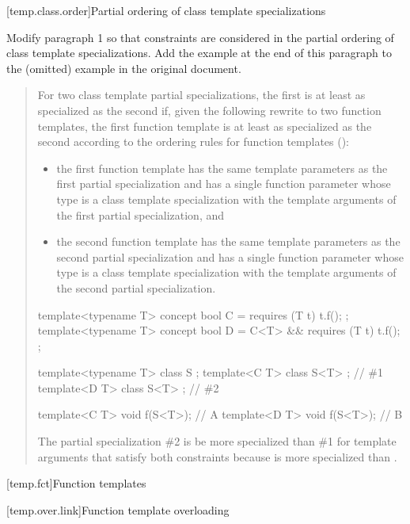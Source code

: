 [temp.class.order]{Partial ordering of class template specializations}

Modify paragraph 1 so that constraints are considered in the
partial ordering of class template specializations. Add the
example at the end of this paragraph to the (omitted) example
in the original document.

\begin{quote}
\pnum
For two class template partial specializations, the first is 
at least as specialized as the second if, given the following 
rewrite to two function templates, the first function template 
is at least as specialized as the second according to the ordering 
rules for function templates 
():

\begin{itemize}
\item the first function template has the same template 
parameters  as the first partial 
specialization and has a single function parameter whose
type is a class template specialization with the template 
arguments of the first partial specialization, and

\item the second function template has the same template 
parameters  as the second partial 
specialization and has a single function parameter whose
type is a class template specialization with the template 
arguments of the second partial specialization.
\end{itemize}
\enterexample
\begin{codeblock}
template<typename T> concept bool C = requires (T t) { t.f(); };
template<typename T> concept bool D = C<T> && requires (T t) { t.f(); };


template<typename T> class S { };
template<C T> class S<T> { }; // \#1
template<D T> class S<T> { }; // \#2

template<C T> void f(S<T>); // A
template<D T> void f(S<T>); // B
\end{codeblock}
The partial specialization \#2 is be more specialized than 
\#1 for template arguments that satisfy both constraints because 
 is more specialized than .
\exitexample
\end{quote}        


[temp.fct]{Function templates}


[temp.over.link]{Function template overloading}

